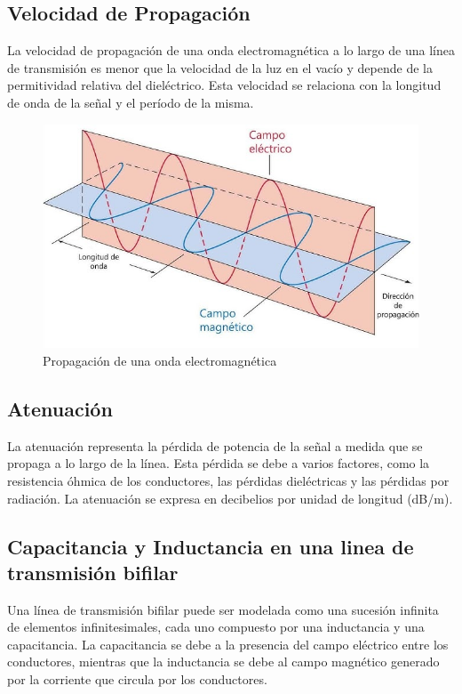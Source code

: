 \subsection{Velocidad de Propagación}

La velocidad de propagación de una onda electromagnética a lo largo de una línea de transmisión es menor que la velocidad de la luz en el vacío y depende de la permitividad relativa del dieléctrico. Esta velocidad se relaciona con la longitud de onda de la señal y el período de la misma.
        \begin{center}
        \begin{figure}[H]
        \centering  
        \includegraphics[scale=0.7]{imagenes/propagacion de una onda electromagnetica.png}
        \caption{Propagación de una onda electromagnética}
        \end{figure}
        \end{center}
\subsection{Atenuación}

La atenuación representa la pérdida de potencia de la señal a medida que se propaga a lo largo de la línea. Esta pérdida se debe a varios factores, como la resistencia óhmica de los conductores, las pérdidas dieléctricas y las pérdidas por radiación. La atenuación se expresa en decibelios por unidad de longitud (dB/m).

\subsection{Capacitancia y Inductancia en una linea de transmisión bifilar}

Una línea de transmisión bifilar puede ser modelada como una sucesión infinita de elementos infinitesimales, cada uno compuesto por una inductancia y una capacitancia. La capacitancia se debe a la presencia del campo eléctrico entre los conductores, mientras que la inductancia se debe al campo magnético generado por la corriente que circula por los conductores.

